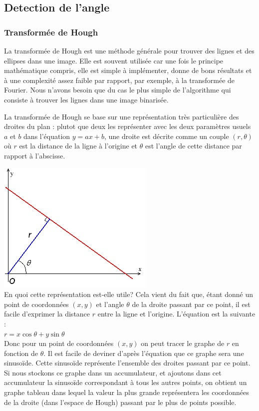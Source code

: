 \subsection{Detection de l'angle}
\subsubsection{Transformée de Hough}

La transformée de Hough est une méthode générale pour trouver des lignes et des ellipses dans une image. Elle est souvent utilisée car une fois le principe mathématique compris, elle est simple à implémenter, donne de bons résultats et à une complexité assez faible par rapport, par exemple, à la transformée de Fourier. Nous n'avons besoin que du cas le plus simple de l'algorithme qui consiste à trouver les lignes dans une image binarisée.

La transformée de Hough se base sur une représentation très particulière des droites du plan : plutot que deux les représenter avec les deux paramètres usuels $a$ et $b$ dans l'équation $y = ax + b$, une droite est décrite comme un couple $(r, \theta)$ où $r$ est la distance de la ligne à l'origine et $\theta$ est l'angle de cette distance par rapport à l'abscisse.

  \includegraphics[scale=0.5]{chapters/Pictures/hough1.jpg}\\
En quoi cette représentation est-elle utile? Cela vient du fait que, étant donné un point de coordonnées $(x, y)$ et l'angle $\theta$ de la droite passant par ce point, il est facile d'exprimer la distance $r$ entre la ligne et l'origine. L'équation est la suivante :\\
$r = x\cos\theta + y\sin\theta$\\
Donc pour un point de coordonnées $(x, y)$ on peut tracer le graphe de $r$ en fonction de $\theta$. Il est facile de deviner d'après l'équation que ce graphe sera une sinusoïde. Cette sinusoïde représente l'ensemble des droites passant par ce point. Si nous stockons ce graphe dans un accumulateur, et ajoutons dans cet accumulateur la sinusoïde correspondant à tous les autres points, on obtient un graphe tableau dans lequel la valeur la plus grande représentera les coordonnées de la droite (dans l'espace de Hough) passant par le plus de points possible.

